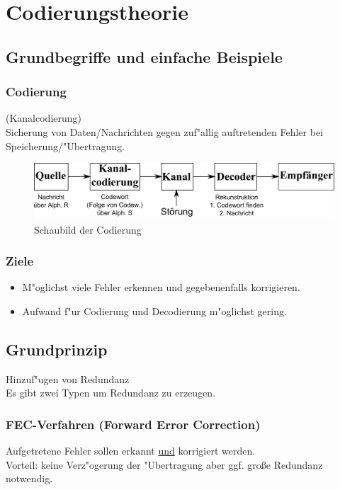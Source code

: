 \chapter{Codierungstheorie}

\section{Grundbegriffe und einfache Beispiele}

\subsection{Codierung} (Kanalcodierung)\\
Sicherung von Daten/Nachrichten gegen zuf"allig auftretenden Fehler bei Speicherung/"Ubertragung.\\
\begin{figure}[h]
	\centering
	\includegraphics[width=15cm]{./img/codierung_schaubild.png}
	\caption{Schaubild der Codierung}
	\label{img:Schaubild Codierung}
\end{figure}

\subsection{Ziele}
\begin{itemize}
	\item M"oglichst viele Fehler erkennen und gegebenenfalls korrigieren. %
	\item Aufwand f"ur Codierung und Decodierung m"oglichst gering.
\end{itemize}

\section{Grundprinzip}
Hinzuf"ugen von Redundanz
\\
Es gibt zwei Typen um Redundanz zu erzeugen.
\subsection{FEC-Verfahren (Forward Error Correction)}
Aufgetretene Fehler sollen erkannt \underline{und} korrigiert werden.\\
Vorteil: keine Verz"ogerung der "Ubertragung aber ggf. gro\ss e Redundanz notwendig.

